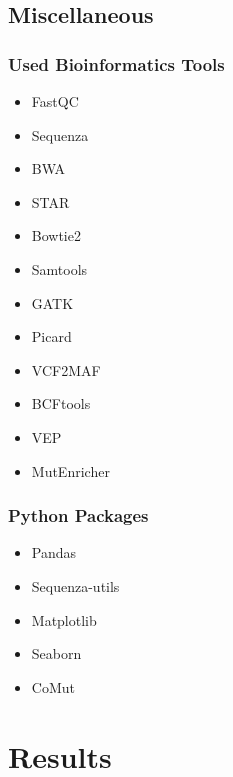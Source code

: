 \documentclass{beamer}
\begin{document}
    \subsection{Miscellaneous}
    \begin{frame}
        \frametitle{Used Bioinformatics Tools}

        \begin{itemize}
            \item FastQC \cite{fastqc1}
            \item Sequenza \cite{sequenza1}
            \item BWA \cite{bwa1, bwa2}
            \item STAR \cite{star1}
            \item Bowtie2 \cite{bowtie1}
            \item Samtools \cite{samtools1}
            \item GATK \cite{gatk1, gatk2}
            \item Picard \cite{picard1}
            \item VCF2MAF \cite{vcf2maf1}
            \item BCFtools \cite{bcftools1}
            \item VEP \cite{vep1}
            \item MutEnricher \cite{MutEnricher1}
        \end{itemize}
    \end{frame}

    \begin{frame}
        \frametitle{Python Packages}

        \begin{itemize}
            \item Pandas \cite{pandas1, pandas2}
            \item Sequenza-utils \cite{sequenza1}
            \item Matplotlib \cite{matplotlib1}
            \item Seaborn \cite{seaborn1}
            \item CoMut \cite{comut1}
        \end{itemize}
    \end{frame}

    \section{Results}
\end{document}
